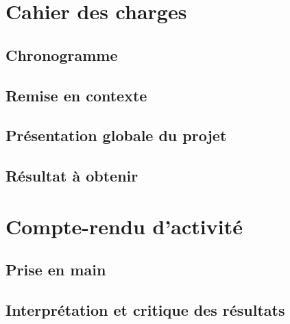 \chapter{Cahier des charges}
\section*{Chronogramme}
\begin{center}
\end{center}
\section{Remise en contexte}

\section{Présentation globale du projet}

\section{Résultat à obtenir}

\chapter{Compte-rendu d'activité}
\paragraph{}

\section{Prise en main}
\section{Interprétation et critique des résultats}
\subparagraph{}
